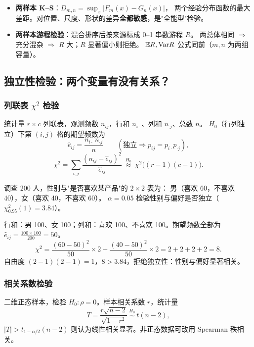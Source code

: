 \begin{itemize}[leftmargin=2em]
  \item \textbf{两样本 K--S}：$D_{m,n}=\sup_x|F_m(x)-G_n(x)|$，
  两个经验分布函数的最大差距。对位置、尺度、形状的差异\textbf{全都敏感}，是"全能型"检验。
  \item \textbf{两样本游程检验}：混合排序后按来源标成 0--1 串数游程 $R$。
  两总体相同 $\Rightarrow$ 充分混杂 $\Rightarrow$ $R$ 大；$R$ 显著偏小则拒绝。
  $\mathbb{E} R,\mathrm{Var} R$ 公式同前（$m,n$ 为两组容量）。
\end{itemize}

\subsection{独立性检验：两个变量有没有关系？}

\subsubsection{列联表 $\chi^2$ 检验}

\begin{kbox}{统计量}
$r\times c$ 列联表，观测频数 $n_{ij}$，行和 $n_{i\cdot}$、列和 $n_{\cdot j}$、总数 $n$。
$H_0$（行列独立）下第 $(i,j)$ 格的期望频数为
\[
\hat e_{ij}=\frac{n_{i\cdot}\,n_{\cdot j}}{n}\qquad(\text{独立}\Rightarrow p_{ij}=p_{i\cdot}p_{\cdot j}),
\]
\[
\chi^2=\sum_{i,j}\frac{(n_{ij}-\hat e_{ij})^2}{\hat e_{ij}}
\ \overset{H_0}{\approx}\ \chi^2\big((r-1)(c-1)\big).
\]
\end{kbox}

\begin{exbox}[列联表检验计算]
调查 200 人，性别与"是否喜欢某产品"的 $2\times2$ 表为：
男（喜欢 60，不喜欢 40），女（喜欢 40，不喜欢 60）。
$\alpha=0.05$ 检验性别与偏好是否独立（$\chi^2_{0.95}(1)=3.84$）。
\end{exbox}
\begin{sol}
行和：男 100、女 100；列和：喜欢 100、不喜欢 100。期望频数全部为
$\hat e_{ij}=\frac{100\times100}{200}=50$。
\[
\chi^2=\frac{(60-50)^2}{50}\times2+\frac{(40-50)^2}{50}\times2=2+2+2+2=8 .
\]
自由度 $(2-1)(2-1)=1$，$8>3.84$，拒绝独立性：性别与偏好显著相关。
\end{sol}

\subsubsection{相关系数检验}

二维正态样本，检验 $H_0:\rho=0$。样本相关系数 $r$，统计量
\[
T=\frac{r\sqrt{n-2}}{\sqrt{1-r^2}}\ \overset{H_0}{\sim}\ t(n-2),
\]
$|T|>t_{1-\alpha/2}(n-2)$ 则认为线性相关显著。非正态数据可改用 Spearman 秩相关。

